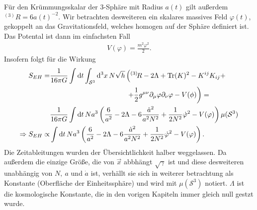\documentclass{scrartcl}
\newcommand{\inHS}{{}^{(3)}\!}
\newcommand{\VSthree}{\mu(\mathcal{S}^3)}
\begin{document}
			Für den Krümmungsskalar der 3-Sphäre mit Radius $a(t)$ gilt außerdem $\inHS R=6 a(t)^{-2}$.
			Wir betrachten desweiteren ein skalares massives Feld $\varphi(t)$, gekoppelt an das Gravitationsfeld,
			welches homogen auf der Sphäre definiert ist. Das Potental ist dann im einfachsten Fall
			\begin{align}
				V(\varphi)=\frac{m^2 \varphi^2}{2}.
			\end{align}
			Insofern folgt für die Wirkung
			\begin{align}
				S_{EH}=&\frac{1}{16\pi G}\int{\rm d}t\int_{\mathcal{S}^3}{\rm d}^3 x\, N\sqrt{h}\left(\inHS R-2\Lambda+{\rm Tr}(K)^2-K^{ij}K_{ij}+\right.\notag\\
						&\qquad\qquad\qquad\quad\qquad\qquad\left.+\frac{1}{2}g^{\mu\nu}\partial_\mu \varphi\partial_\nu \varphi-V(\phi)\right)=\notag\\
					&\frac{1}{16\pi G}\int{\rm d}t\, N a^3\left(\frac{6}{a^2}-2\Lambda-6\frac{\dot{a}^2}{a^2N^2}+\frac{1}{2 N^2}\dot{\varphi}^2-V(\varphi)\right) \VSthree\\
					\Rightarrow S_{EH} \propto& \int{\rm d}t\, N a^3\left(\frac{6}{a^2}-2\Lambda-6\frac{\dot{a}^2}{a^2N^2}+\frac{1}{2 N^2}\dot{\varphi}^2-V(\varphi)\right).
			\end{align}
			Die Zeitableitungen wurden der Übersichtlichkeit halber weggelassen. Da außerdem die einzige Größe, die von $\vec{x}$ abbhängt $\sqrt{\gamma}$ ist
			und diese desweiteren unabhängig von $N,\ a$ und $\dot{a}$ ist, verhällt sie sich in weiterer betrachtung als Konstante (Oberfläche der Einheitssphäre) und
			wird mit $\VSthree$ notiert. $\Lambda$ ist die kosmologische Konstante, die in den vorigen Kapiteln immer gleich null gestzt wurde.
			
\end{document}
